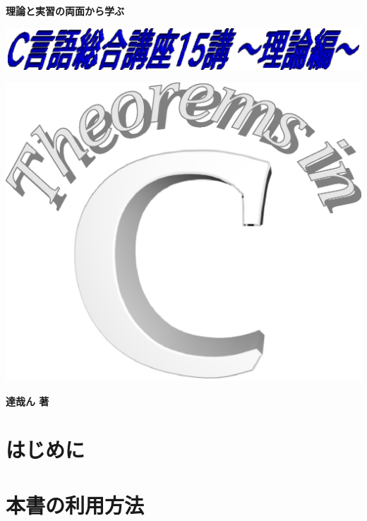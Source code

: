 \documentclass[a4j,12pt]{jreport}
\begin{document}
\makeatletter
\renewcommand{\thelstlisting}{\thechapter.\@arabic\c@lstlisting}
\makeatother

\begin{titlepage}
\vspace{24pt}
\textbf{\large 理論と実習の両面から学ぶ}
\begin{center}
\includegraphics[width=0.95\linewidth,keepaspectratio]{title1.eps}
\end{center}
\vspace{120pt}
\begin{center}
\includegraphics[width=0.75\linewidth,keepaspectratio]{title2.eps}
\end{center}
\vspace{120pt}
\begin{flushright}
\textbf{\LARGE 達哉ん 著}
\end{flushright}
\end{titlepage}
\newpage
{}
\chapter*{はじめに}


\chapter*{本書の利用方法}

\end{document}
